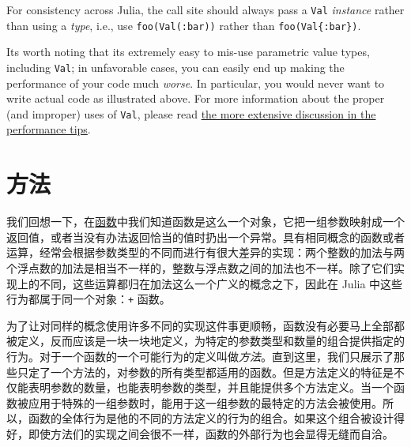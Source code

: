 For consistency across Julia, the call site should always pass a \texttt{Val} \emph{instance} rather than using a \emph{type}, i.e., use \texttt{foo(Val(:bar))} rather than \texttt{foo(Val\{:bar\})}.



It{\textquotesingle}s worth noting that it{\textquotesingle}s extremely easy to mis-use parametric {\textquotedbl}value{\textquotedbl} types, including \texttt{Val}; in unfavorable cases, you can easily end up making the performance of your code much \emph{worse}.  In particular, you would never want to write actual code as illustrated above.  For more information about the proper (and improper) uses of \texttt{Val}, please read \hyperlink{17259605703392147735}{the more extensive discussion in the performance tips}.





\hypertarget{12379207465798704957}{}


\chapter{方法}



我们回想一下，在\hyperlink{645008301484218813}{函数}中我们知道函数是这么一个对象，它把一组参数映射成一个返回值，或者当没有办法返回恰当的值时扔出一个异常。具有相同概念的函数或者运算，经常会根据参数类型的不同而进行有很大差异的实现：两个整数的加法与两个浮点数的加法是相当不一样的，整数与浮点数之间的加法也不一样。除了它们实现上的不同，这些运算都归在{\textquotedbl}加法{\textquotedbl}这么一个广义的概念之下，因此在 Julia 中这些行为都属于同一个对象：\texttt{+} 函数。



为了让对同样的概念使用许多不同的实现这件事更顺畅，函数没有必要马上全部都被定义，反而应该是一块一块地定义，为特定的参数类型和数量的组合提供指定的行为。对于一个函数的一个可能行为的定义叫做\emph{方法}。直到这里，我们只展示了那些只定了一个方法的，对参数的所有类型都适用的函数。但是方法定义的特征是不仅能表明参数的数量，也能表明参数的类型，并且能提供多个方法定义。当一个函数被应用于特殊的一组参数时，能用于这一组参数的最特定的方法会被使用。所以，函数的全体行为是他的不同的方法定义的行为的组合。如果这个组合被设计得好，即使方法们的实现之间会很不一样，函数的外部行为也会显得无缝而自洽。



